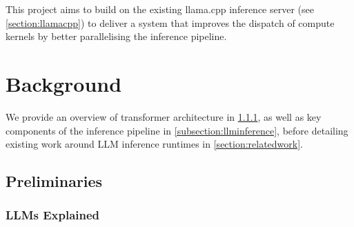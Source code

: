 \documentclass[12pt,twoside]{report}
\begin{document}
This project aims to build on the existing llama.cpp inference server (see \ref{section:llamacpp}) to deliver a system that improves the dispatch of compute kernels by better parallelising the inference pipeline.

\chapter{Background} %
We provide an overview of transformer architecture in \ref{subsection:llmsexplained}, as well as key components of the inference pipeline in \ref{subsection:llminference}, before detailing existing work around LLM inference runtimes in \ref{section:relatedwork}.
\section{Preliminaries}
\subsection{LLMs Explained}\label{subsection:llmsexplained}
\end{document}
